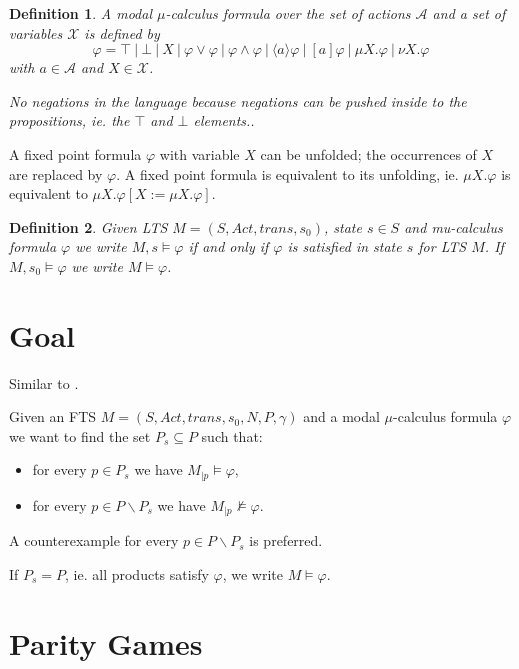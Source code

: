 \documentclass[]{article}
\newtheorem{definition}{Definition}[section]
\begin{document}
\begin{definition}
	\label{def_mu}\cite{Bradfield2018}
	A modal $\mu$-calculus formula over the set of actions $\mathcal{A}$ and a set of variables $\mathcal{X}$ is defined by
	\[ \varphi = \top\ |\ \bot\ |\ X\ |\ \varphi \vee \varphi\ |\ \varphi \wedge \varphi\ |\ \langle a \rangle \varphi\ |\ [a]\varphi\ |\ \mu X.\varphi\ |\ \nu X.\varphi \]
	with $a \in \mathcal{A}$ and $X \in \mathcal{X}$. 
	
	
	No negations in the language because negations can be pushed inside to the propositions, ie. the $\top$ and $\bot$ elements..
\end{definition}
A fixed point formula $\varphi$ with variable $X$ can be unfolded; the occurrences of $X$ are replaced by $\varphi$. A fixed point formula is equivalent to its unfolding, ie. $\mu X. \varphi$ is equivalent to $\mu X. \varphi[X:=\mu X. \varphi]$. \cite{Bradfield2018}

\begin{definition}
	\label{def_sat}
	Given LTS $M = (S, Act, trans, s_0)$, state $s \in S$ and mu-calculus formula $\varphi$ we write $M,s \models \varphi$ if and only if $\varphi$ is satisfied in state $s$ for LTS $M$. If $M, s_0 \models \varphi$ we write $M \models \varphi$.
\end{definition}
\section{Goal}
Similar to \cite{inproceedings}.

Given an FTS $M = (S, Act, trans, s_0, N, P, \gamma)$ and a modal $\mu$-calculus formula $\varphi$ we want to find the set $P_s \subseteq P$ such that:
\begin{itemize}
	\item for every $p \in P_s$ we have $M_{|p} \models \varphi$,
	\item for every $p \in P \backslash P_s$ we have $M_{|p} \not\models \varphi$.
\end{itemize}
A counterexample for every $p \in P \backslash P_s$ is preferred.

If $P_s = P$, ie. all products satisfy $\varphi$, we write $M \models \varphi$.

\section{Parity Games}
\end{document}
